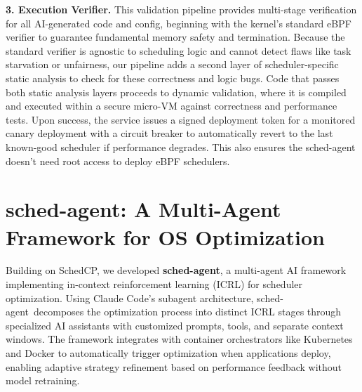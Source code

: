 \documentclass[preprint]{article}
\newcommand{\sys}{SchedCP\xspace}
\newcommand{\agent}{sched-agent\xspace}
\begin{document}
\textbf{3. Execution Verifier.} This validation pipeline provides multi-stage verification for all AI-generated code and config, beginning with the kernel's standard eBPF verifier to guarantee fundamental memory safety and termination. Because the standard verifier is agnostic to scheduling logic and cannot detect flaws like task starvation or unfairness, our pipeline adds a second layer of scheduler-specific static analysis to check for these correctness and logic bugs. Code that passes both static analysis layers proceeds to dynamic validation, where it is compiled and executed within a secure micro-VM against correctness and performance tests. Upon success, the service issues a signed deployment token for a monitored canary deployment with a circuit breaker to automatically revert to the last known-good scheduler if performance degrades. This also ensures the \agent doesn't need root access to deploy eBPF schedulers.

\section{\agent: A Multi-Agent Framework for OS Optimization}
\label{sec:sched_agents}

Building on \sys, we developed \textbf{\agent}, a multi-agent AI framework implementing in-context reinforcement learning (ICRL)\cite{incontextrl} for scheduler optimization. Using Claude Code's subagent architecture\cite{anthropic2024subagents}, \agent\ decomposes the optimization process into distinct ICRL stages through specialized AI assistants with customized prompts, tools, and separate context windows\cite{anthropic2024multiagent}. The framework integrates with container orchestrators like Kubernetes and Docker to automatically trigger optimization when applications deploy, enabling adaptive strategy refinement based on performance feedback without model retraining.
\end{document}
